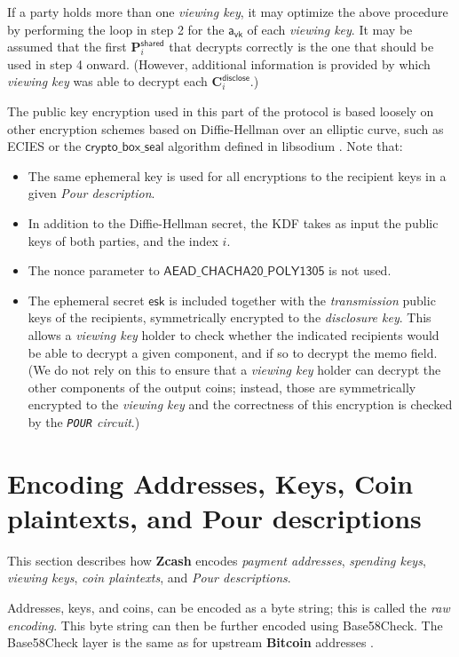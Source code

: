 \documentclass{article}
\newcommand{\term}[1]{\textsl{#1}\xspace}
\newcommand{\termbf}[1]{\textbf{#1}\xspace}
\newcommand{\Zcash}{\termbf{Zcash}}
\newcommand{\Bitcoin}{\termbf{Bitcoin}}
\newcommand{\PourDescription}{\term{Pour description}}
\newcommand{\PourDescriptions}{\term{Pour descriptions}}
\newcommand{\paymentAddresses}{\term{payment addresses}}
\newcommand{\viewingKey}{\term{viewing key}}
\newcommand{\viewingKeys}{\term{viewing keys}}
\newcommand{\spendingKeys}{\term{spending keys}}
\newcommand{\coinPlaintexts}{\term{coin plaintexts}}
\newcommand{\transmitKeypair}{\term{transmission}}
\newcommand{\discloseKey}{\term{disclosure key}}
\newcommand{\DiscloseKey}{\mathsf{a_{vk}}}
\newcommand{\disclose}{\mathsf{disclose}}
\newcommand{\shared}{\mathsf{shared}}
\newcommand{\EphemeralPrivate}{\mathsf{esk}}
\newcommand{\Plaintext}{\mathbf{P}}
\newcommand{\Ciphertext}{\mathbf{C}}
\newcommand{\DiscloseCiphertext}[1]{\Ciphertext^\disclose_{#1}}
\newcommand{\SharedPlaintext}[1]{\Plaintext^\shared_{#1}}
\newcommand{\SymSpecific}{\mathsf{AEAD\_CHACHA20\_POLY1305}}
\newcommand{\CryptoBoxSeal}{\mathsf{crypto\_box\_seal}}
\newcommand{\PourCircuit}{\term{\texttt{POUR} circuit}}
\begin{document}
{If a party holds more than one \viewingKey, it may optimize the above
procedure by performing the loop in step 2 for the $\DiscloseKey{}$ of each
\viewingKey. It may be assumed that the first $\SharedPlaintext{i}$ that
decrypts correctly is the one that should be used in step 4 onward.
(However, additional information is provided by which \viewingKey was able
to decrypt each $\DiscloseCiphertext{i}$.)

The public key encryption used in this part of the protocol is based loosely on
other encryption schemes based on Diffie-Hellman over an elliptic curve, such
as ECIES or the $\CryptoBoxSeal$ algorithm defined in libsodium \cite{cryptoboxseal}.
Note that:
\begin{itemize}
  \item The same ephemeral key is used for all encryptions to the recipient keys
        in a given \PourDescription.
  \item In addition to the Diffie-Hellman secret, the KDF takes as input the
        public keys of both parties, and the index $i$.
  \item The nonce parameter to $\SymSpecific$ is not used.
  \item The ephemeral secret $\EphemeralPrivate$ is included together with
        the \transmitKeypair public keys of the recipients, symmetrically
        encrypted to the \discloseKey.
        This allows a \viewingKey holder to check whether the
        indicated recipients would be able to decrypt a given component, and
        if so to decrypt the memo field. (We do not rely on this to ensure
        that a \viewingKey holder can decrypt the other components of the
        output coins; instead, those are symmetrically encrypted to the
        \viewingKey and the correctness of this encryption is checked by the
        \PourCircuit.)
\end{itemize}
}


\section{Encoding Addresses, Keys, Coin plaintexts, and Pour descriptions}

This section describes how \Zcash encodes \paymentAddresses, \spendingKeys,
\viewingKeys, \coinPlaintexts, and \PourDescriptions.

Addresses, keys, and coins, can be encoded as a byte string; this is called
the \term{raw encoding}. This byte string can then be further encoded using
Base58Check. The Base58Check layer is the same as for upstream \Bitcoin
addresses \cite{Base58Check}.
\end{document}
